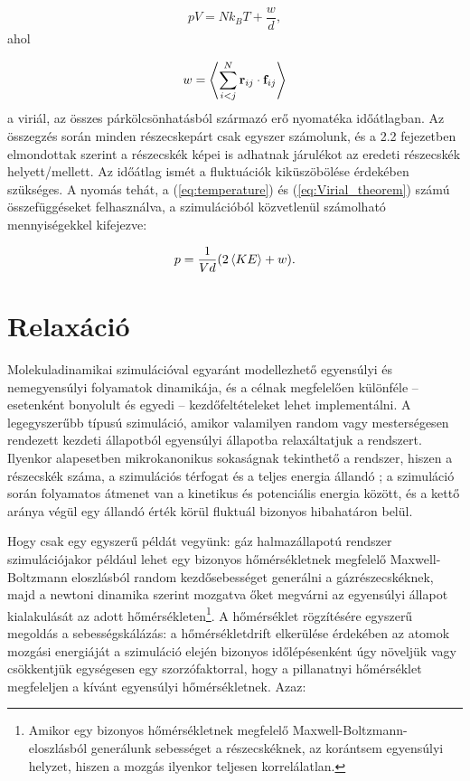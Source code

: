 \documentclass[12pt]{article}
\theoremstyle{plain}
\begin{document}
\begin{equation}
	p V = N k_B T + \frac{w}{d},
	\label{eq:Virial_theorem}
\end{equation}
ahol 

\begin{equation}
	w = \Braket{\sum_{i<j}^{N} \mathbf{r}_{ij} \cdot \mathbf{f}_{ij}}
	\label{eq:Virial}
\end{equation}
a viriál, az összes párkölcsönhatásból származó erő nyomatéka időátlagban. Az összegzés során minden részecskepárt csak egyszer számolunk, és a 2.2 fejezetben elmondottak szerint a részecskék képei is adhatnak járulékot az eredeti részecskék helyett/mellett. Az időátlag ismét a fluktuációk kiküszöbölése érdekében szükséges. A nyomás tehát, a (\ref{eq:temperature}) és (\ref{eq:Virial_theorem}) számú összefüggéseket felhasználva, a szimulációból közvetlenül számolható mennyiségekkel kifejezve:

\begin{equation}
	p = \frac{1}{V d} (2 \braket{KE} + w).
	\label{eq:pressure}
\end{equation}


\section{Relaxáció}

Molekuladinamikai szimulációval egyaránt modellezhető egyensúlyi és nemegyensúlyi folyamatok dinamikája, és a célnak megfelelően különféle -- esetenként bonyolult és egyedi -- kezdőfeltételeket lehet implementálni. A legegyszerűbb típusú szimuláció, amikor valamilyen random vagy mesterségesen rendezett kezdeti állapotból egyensúlyi állapotba relaxáltatjuk a rendszert. Ilyenkor alapesetben mikrokanonikus sokaságnak tekinthető a rendszer, hiszen a részecskék száma, a szimulációs térfogat és a teljes energia állandó \cite{Landau2012}; a szimuláció során folyamatos átmenet van a kinetikus és potenciális energia között, és a kettő aránya végül egy állandó érték körül fluktuál bizonyos hibahatáron belül. 

Hogy csak egy egyszerű példát vegyünk: gáz halmazállapotú rendszer szimulációjakor például lehet egy bizonyos hőmérsékletnek megfelelő Maxwell-Boltzmann eloszlásból random kezdősebességet generálni a gázrészecskéknek, majd a newtoni dinamika szerint mozgatva őket megvárni az egyensúlyi állapot kialakulását az adott hőmérsékleten\footnote{Amikor egy bizonyos hőmérsékletnek megfelelő Maxwell-Boltzmann-eloszlásból generálunk sebességet a részecskéknek, az korántsem egyensúlyi helyzet, hiszen a mozgás ilyenkor teljesen korrelálatlan.}. A hőmérséklet rögzítésére egyszerű megoldás a sebességskálázás: a hőmérsékletdrift elkerülése érdekében az atomok mozgási energiáját a szimuláció elején bizonyos időlépésenként úgy növeljük vagy csökkentjük egységesen egy szorzófaktorral, hogy a pillanatnyi hőmérséklet megfeleljen a kívánt egyensúlyi hőmérsékletnek. Azaz:
\end{document}
